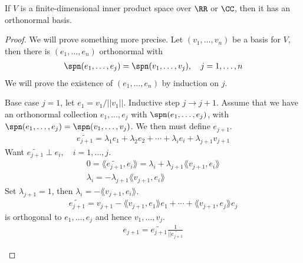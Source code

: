 \documentclass[class=scrartcl, crop=false]{standalone}
\begin{document}
\begin{theorem}
  If $V$ is a finite-dimensional inner product space over $\RR$ or $\CC$, then it has an orthonormal basis.
  \begin{proof}
    We will prove something more precise. Let $(v_1, \dots, v_n)$ be a basis for $V$, then there is $(e_1, \dots, e_n)$ orthonormal with 
    \begin{gather*}
      \spn(e_1, \dots, e_j) = \spn(v_1, \dots, v_j), \quad j = 1, \dots, n
    \end{gather*} 
    We will prove the existence of $(e_1, \dots, e_n)$ by induction on $j$.
    \begin{enumerate}
      \ii
      Base case $j = 1$, let $ e_1 = v_1 / ||v_1||$.
      \ii
      Inductive step $j \to j + 1$. Assume that we have an orthonormal collection $ e_1, \dots, e_j$ with $\spn(e_1, \dots, e_j)$, with $\spn(e_1, \dots, e_j) = \spn(v_1, \dots, v_j)$. We then must define $e_{j + 1}$.
      \begin{gather*}
        \widetilde{e_{j + 1}} = \lambda_1e_1 + \lambda_2e_2 + \cdots + \lambda_ie_i + \lambda_{j + 1}v_{j + 1}
      \end{gather*} 
      Want $\widetilde{e_{j + 1}} \perp e_i, \quad i = 1, \dots, j$.
      \begin{gather*}
        0 = \lang \widetilde{e_{j + 1}}, e_i \rang = \lambda_i + \lambda_{j + 1}\lang v_{j + 1}, e_i \rang \\
        \lambda_i = -\lambda_{j + 1} \lang v_{j + 1}, e_i \rang
      \end{gather*} 
      Set $\lambda_{j + 1} = 1$, then $\lambda_i = -\lang v_{j + 1}, e_i \rang$.
      \begin{gather*}
        \widetilde{e_{j + 1}} = v_{j+ 1} - \lang v_{j + 1}, e_1 \rang e_1 + \cdots + \lang v_{j + 1}, e_j \rang e_j
      \end{gather*} 
      is orthogonal to $e_1, \dots, e_j$ and hence $ v_1, \dots, v_j$.
      \begin{gather*}
        e_{j + 1} = \widetilde{e_{j + 1}} \frac{1}{||\widetilde{e_{j + 1}}}
      \end{gather*} 
    \end{enumerate} 
  \end{proof} 
\end{theorem} 
\end{document}
